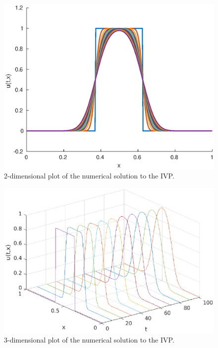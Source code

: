 \documentclass[11pt]{article}
\begin{document}
\newpage
\begin{figure}[ht]
	\centering
	\includegraphics{heat_eq_2d}
	\caption{2-dimensional plot of the numerical solution to the IVP.}
\end{figure}
\newpage
\begin{figure}[ht]
	\centering
	\includegraphics{heat_eq_3d}
	\caption{3-dimensional plot of the numerical solution to the IVP.}
\end{figure}
\end{document}
